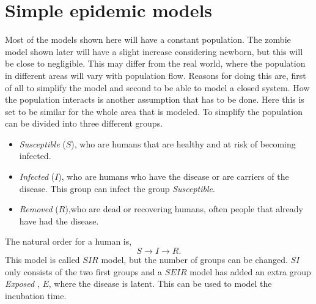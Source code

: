 \documentclass[%
twoside,                 %
final,                   %
chapterprefix=true,      %
open=right               %
10pt]{book}
\begin{document}
\section{Simple epidemic models}
\label{section:1_simple_epidemic_models}
Most of the models shown here will have a constant population. The zombie model shown later will have a slight increase considering newborn, but this will be close to negligible. This may differ from the real world, where the population in different areas will vary with population flow. Reasons for doing this are, first of all to simplify the model and second to be able to model a closed system. How the population interacts is another assumption that has to be done. Here this is set to be similar for the whole area that is modeled. To simplify the population can be divided into three different groups. 
\begin{itemize}
\item \emph{Susceptible} ($S$), who are humans that are healthy and at risk of becoming infected. 

\item \emph{Infected} ($I$), who are humans who have the disease or are carriers of the disease. This group can infect the group \emph{Susceptible}. 

\item \emph{Removed} ($R$),who are dead or recovering humans, often people that already have had the disease. 
\end{itemize}

\noindent
The natural order for a human is,
\begin{equation*}
S \rightarrow I \rightarrow R.
\end{equation*}
This model is called $SIR$ model, but the number of groups can be changed. $SI$ only consists of the two first groups and a $SEIR$ model has added an extra group \emph{Exposed} , $E$, where the disease is latent. This can be used to model the incubation time. 


\vspace{3mm}




\vspace{3mm}
\end{document}
